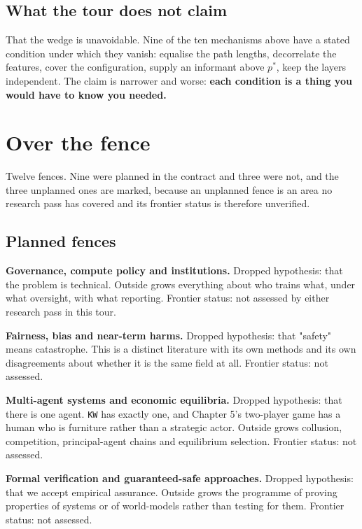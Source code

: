 \section*{What the tour does not claim}

That the wedge is unavoidable. Nine of the ten mechanisms above have a stated condition under which they vanish: equalise the path lengths, decorrelate the features, cover the configuration, supply an informant above $p^*$, keep the layers independent. The claim is narrower and worse: \textbf{each condition is a thing you would have to know you needed.}

\chapter*{Over the fence}

Twelve fences. Nine were planned in the contract and three were not, and the three unplanned ones are marked, because an unplanned fence is an area no research pass has covered and its frontier status is therefore unverified.

\section*{Planned fences}

\textbf{Governance, compute policy and institutions.} Dropped hypothesis: that the problem is technical. Outside grows everything about who trains what, under what oversight, with what reporting. Frontier status: not assessed by either research pass in this tour.

\textbf{Fairness, bias and near-term harms.} Dropped hypothesis: that "safety" means catastrophe. This is a distinct literature with its own methods and its own disagreements about whether it is the same field at all. Frontier status: not assessed.

\textbf{Multi-agent systems and economic equilibria.} Dropped hypothesis: that there is one agent. \texttt{KW} has exactly one, and Chapter 5's two-player game has a human who is furniture rather than a strategic actor. Outside grows collusion, competition, principal-agent chains and equilibrium selection. Frontier status: not assessed.

\textbf{Formal verification and guaranteed-safe approaches.} Dropped hypothesis: that we accept empirical assurance. Outside grows the programme of proving properties of systems or of world-models rather than testing for them. Frontier status: not assessed.

